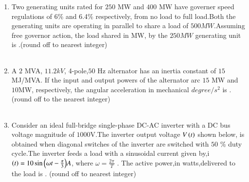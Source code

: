 \documentclass[journal]{IEEEtran}
\begin{document}
\begin {enumerate}
\item Two generating units rated for $250$ MW and $400$ MW have governer speed regulations of 6\% and 6.4\%
respectively, from no load to full load.Both the generating units are operating in parallel to share a load of $500 MW$.Assuming free governor action, the load shared in MW, by the $250 MW$ generating unit is \underline{\hspace{2cm}}.(round off to nearest integer) \\ \\

\item A $2$ MVA, $11.2 kV$, 4-pole,$50$ Hz alternator has an inertia constant of $15$ MJ/MVA. If the input and output powers of the alternator arc $15$ MW and $10$MW, respectively, the angular acceleration in mechanical $degree/s^2$  is \underline{\hspace{2cm}}. (round off to the nearest integer)  \\ \\

\item Consider an ideal full-bridge single-phase DC-AC inverter with a DC bus voltage magnitude of $1000$V.The inverter output voltage $V\left(t\right)$ shown below, is obtained when diagonal switches of the inverter are switched with $50$ \% duty cycle.The inverter feeds a load with a sinusoidal current
given by,i$\left(t\right)=10\sin{\ensuremath{\left({\omega}t-\frac{\pi}{3}\right)}}A$, where  $\omega = \frac{2\pi}{T}$ . The active power,in watts,delivered to the load is \underline{\hspace{2cm}}. (round off to nearest integer) \\ \\ \\ \\
\begin{figure}[!ht]
\centering
{}%
\end{figure}


\end{enumerate}
\end{document}
